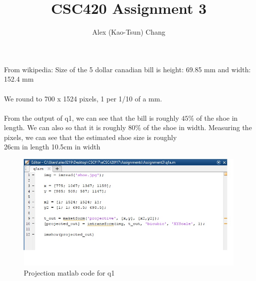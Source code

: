 \documentclass[]{article}
\title{CSC420 Assignment 3}
\author{Alex (Kao-Tsun) Chang}
\begin{document}
\maketitle


\section{}

From wikipedia: Size of the 5 dollar canadian bill is height: 69.85 mm and width: 152.4 mm
\\ \\ We round to 700 x 1524 pixels, 1 per 1/10 of a mm. 
\\ \\ From the output of q1, we can see that the bill is roughly $45 \% $ of the shoe in length. We can also so that it is roughly $80 \% $ of the shoe in width. 
Measuring the pixels, we can see that the estimated shoe size is roughly\\
26cm in length
10.5cm in width

\begin{figure}[h!]
\centering
\includegraphics[width=1.35\textwidth]{img/q1code.jpg}
\caption{Projection matlab code for q1}
\end{figure}
\end{document}
